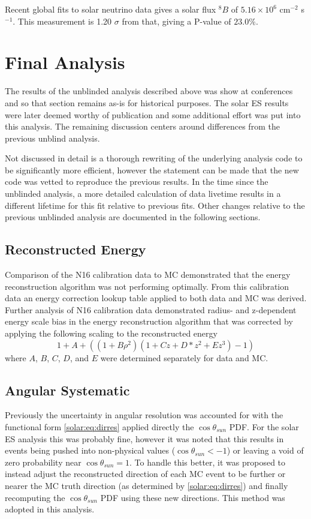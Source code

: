 Recent global fits to solar neutrino data gives a solar flux $^{8}B$ of
$5.16 \times 10^6$ cm$^{-2}$ s$^{-1}$.
This measurement is 1.20 $\sigma$ from that, giving a P-value of $23.0\%$.


\section{Final Analysis}
\label{sec:solar:updated}
The results of the unblinded analysis described above was show at conferences and so that section remains as-is for historical purposes. 
The solar ES results were later deemed worthy of publication and some additional effort was put into this analysis.
The remaining discussion centers around differences from the previous unblind analysis.

Not discussed in detail is a thorough rewriting of the underlying analysis code to be significantly more efficient, however the statement can be made that the new code was vetted to reproduce the previous results.
In the time since the unblinded analysis, a more detailed calculation of data livetime results in a different lifetime for this fit relative to previous fits.
Other changes relative to the previous unblinded analysis are documented in the following sections.


\subsection{Reconstructed Energy}
Comparison of the N16 calibration data to MC demonstrated that the energy reconstruction algorithm was not performing optimally.
From this calibration data an energy correction lookup table applied to both data and MC was derived.
Further analysis of N16 calibration data demonstrated radius- and z-dependent energy scale bias in the energy reconstruction algorithm that was corrected by applying the following scaling to the reconstructed energy
\begin{equation}
1 + A + ( (1 + B \rho^2)(1 + Cz + D*z^2 + Ez^3) - 1 )
\end{equation}
where $A$, $B$, $C$, $D$, and $E$ were determined separately for data and MC.

\subsection{Angular Systematic}
Previously the uncertainty in angular resolution was accounted for with the functional form  \ref{solar:eq:dirres} applied directly the $\cos \theta_{sun}$ PDF. 
For the solar ES analysis this was probably fine, however it was noted that this results in events being pushed into non-physical values ($\cos \theta_{sun} < -1$) or leaving a void of zero probability near $\cos \theta_{sun} = 1$.
To handle this better, it was proposed to instead adjust the reconstructed direction of each MC event to be further or nearer the MC truth direction (as determined by  \ref{solar:eq:dirres}) and finally recomputing the $\cos \theta_{sun}$ PDF using these new directions.
This method was adopted in this analysis.

